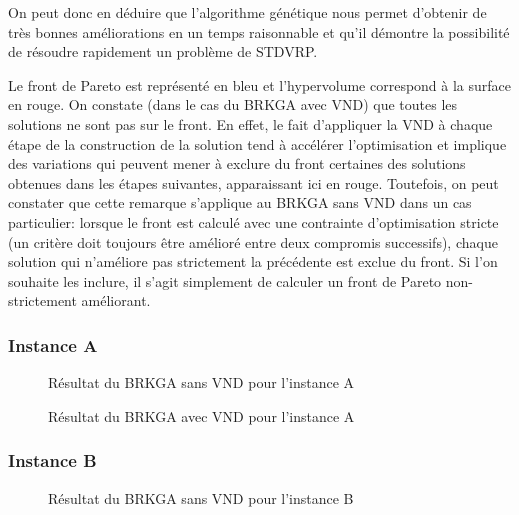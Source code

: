             On peut donc en déduire que l'algorithme génétique nous permet d'obtenir de très bonnes améliorations en un temps raisonnable et qu'il démontre la possibilité de résoudre rapidement un problème de STDVRP.

            Le front de Pareto est représenté en bleu et l'hypervolume correspond à la surface en rouge. On constate (dans le cas du BRKGA avec VND) que toutes les solutions ne sont pas sur le front. En effet, le fait d'appliquer la VND à chaque étape de la construction de la solution tend à accélérer l'optimisation et implique des variations qui peuvent mener à exclure du front certaines des solutions obtenues dans les étapes suivantes, apparaissant ici en rouge. Toutefois, on peut constater que cette remarque s'applique au BRKGA sans VND dans un cas particulier: lorsque le front est calculé avec une contrainte d'optimisation stricte (un critère doit toujours être amélioré entre deux compromis successifs), chaque solution qui n'améliore pas strictement la précédente est exclue du front. Si l'on souhaite les inclure, il s'agit simplement de calculer un front de Pareto non-strictement améliorant.

            
            \subsubsection{Instance A}
                
                \begin{figure}[H]
                    
                \caption{Résultat du BRKGA sans VND pour l'instance A}
                \label{fig:10m2i2d-sansvnd}
                \end{figure}
                
                \begin{figure}[H]
                    
                \caption{Résultat du BRKGA avec VND pour l'instance A}
                \label{fig:10m2i2d-avecvnd}
                \end{figure}
                
            \subsubsection{Instance B}
                \begin{figure}[H]
                    
                \caption{Résultat du BRKGA sans VND pour l'instance B}
                \label{fig:20m3i3d-sansvnd}
                \end{figure}
                
